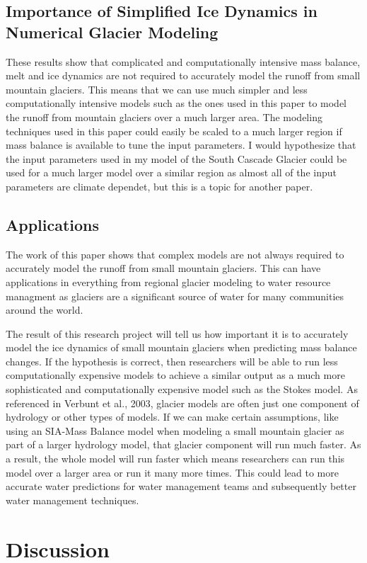 \documentclass{article}
\begin{document}
\subsection{Importance of Simplified Ice Dynamics in Numerical Glacier Modeling}
These results show that complicated and computationally intensive mass balance, melt and ice dynamics are not required to accurately model the 
runoff from small mountain glaciers. This means that we can use much simpler and less computationally intensive models such as the ones used 
in this paper to model the runoff from mountain glaciers over a much larger area. The modeling techniques used in this paper could easily be 
scaled to a much larger region if mass balance is available to tune the input parameters. I would hypothesize that the input parameters used 
in my model of the South Cascade Glacier could be used for a much larger model over a similar region as almost all of the input parameters are 
climate dependet, but this is a topic for another paper. 
\subsection{Applications}
The work of this paper shows that complex models are not always required to accurately model the runoff from small mountain glaciers. This 
can have applications in everything from regional glacier modeling to water resource managment as glaciers are a significant source of water 
for many communities around the world. 

The result of this research project will tell us how important it is to accurately model the ice dynamics of small mountain glaciers when 
predicting mass balance changes. If the hypothesis is correct, then researchers will be able to run less computationally expensive models to 
achieve a similar output as a much more sophisticated and computationally expensive model such as the Stokes model. As referenced in Verbunt 
et al., 2003, glacier models are often just one component of hydrology or other types of models. If we can make certain assumptions, like 
using an SIA-Mass Balance model when modeling a small mountain glacier as part of a larger hydrology model, that glacier component will run 
much faster. As a result, the whole model will run faster which means researchers can run this model over a larger area or run it many more 
times. This could lead to more accurate water predictions for water management teams and subsequently better water management techniques.  
\section{Discussion}
\end{document}

